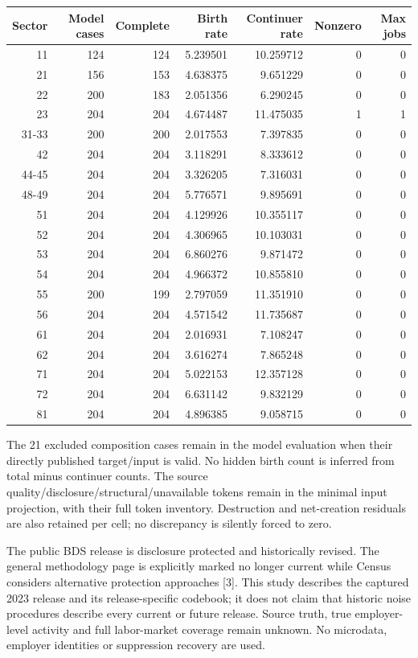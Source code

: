 \documentclass[11pt]{article}
\begin{document}
\begin{center}\small\setlength{\tabcolsep}{4pt}
\begin{tabular}{rrrrrrr}\toprule
Sector & Model cases & Complete & Birth rate & Continuer rate & Nonzero & Max jobs \\
\midrule
11 & 124 & 124 & 5.239501 & 10.259712 & 0 & 0 \\
21 & 156 & 153 & 4.638375 & 9.651229 & 0 & 0 \\
22 & 200 & 183 & 2.051356 & 6.290245 & 0 & 0 \\
23 & 204 & 204 & 4.674487 & 11.475035 & 1 & 1 \\
31-33 & 200 & 200 & 2.017553 & 7.397835 & 0 & 0 \\
42 & 204 & 204 & 3.118291 & 8.333612 & 0 & 0 \\
44-45 & 204 & 204 & 3.326205 & 7.316031 & 0 & 0 \\
48-49 & 204 & 204 & 5.776571 & 9.895691 & 0 & 0 \\
51 & 204 & 204 & 4.129926 & 10.355117 & 0 & 0 \\
52 & 204 & 204 & 4.306965 & 10.103031 & 0 & 0 \\
53 & 204 & 204 & 6.860276 & 9.871472 & 0 & 0 \\
54 & 204 & 204 & 4.966372 & 10.855810 & 0 & 0 \\
55 & 200 & 199 & 2.797059 & 11.351910 & 0 & 0 \\
56 & 204 & 204 & 4.571542 & 11.735687 & 0 & 0 \\
61 & 204 & 204 & 2.016931 & 7.108247 & 0 & 0 \\
62 & 204 & 204 & 3.616274 & 7.865248 & 0 & 0 \\
71 & 204 & 204 & 5.022153 & 12.357128 & 0 & 0 \\
72 & 204 & 204 & 6.631142 & 9.832129 & 0 & 0 \\
81 & 204 & 204 & 4.896385 & 9.058715 & 0 & 0 \\
\bottomrule\end{tabular}\end{center}
The 21 excluded composition cases remain in the model evaluation when their directly published target/input is valid. No hidden birth count is inferred from total minus continuer counts. The source quality/disclosure/structural/unavailable tokens remain in the minimal input projection, with their full token inventory. Destruction and net-creation residuals are also retained per cell; no discrepancy is silently forced to zero.

The public BDS release is disclosure protected and historically revised. The general methodology page is explicitly marked no longer current while Census considers alternative protection approaches [3]. This study describes the captured 2023 release and its release-specific codebook; it does not claim that historic noise procedures describe every current or future release. Source truth, true employer-level activity and full labor-market coverage remain unknown. No microdata, employer identities or suppression recovery are used.
\end{document}

